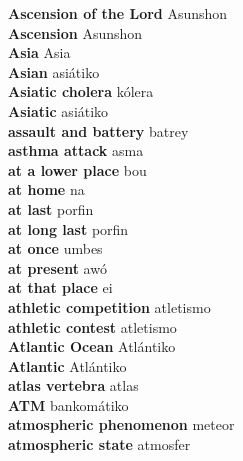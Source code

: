 \textbf{ Ascension of the Lord  } Asunshon \\
\textbf{ Ascension  } Asunshon \\
\textbf{ Asia  } Asia \\
\textbf{ Asian  } asiátiko \\
\textbf{ Asiatic cholera  } kólera \\
\textbf{ Asiatic  } asiátiko \\
\textbf{ assault and battery  } batrey \\
\textbf{ asthma attack  } asma \\
\textbf{ at a lower place  } bou \\
\textbf{ at home  } na \\
\textbf{ at last  } porfin \\
\textbf{ at long last  } porfin \\
\textbf{ at once  } umbes \\
\textbf{ at present  } awó \\
\textbf{ at that place  } ei \\
\textbf{ athletic competition  } atletismo \\
\textbf{ athletic contest  } atletismo \\
\textbf{ Atlantic Ocean  } Atlántiko \\
\textbf{ Atlantic  } Atlántiko \\
\textbf{ atlas vertebra  } atlas \\
\textbf{ ATM  } bankomátiko \\
\textbf{ atmospheric phenomenon  } meteor \\
\textbf{ atmospheric state  } atmosfer \\

